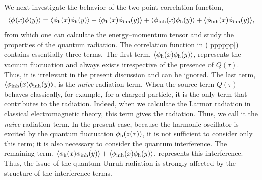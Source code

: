 \documentclass[aps,prd,preprintnumbers,nofootinbib,showpacs,11pt]{revtex4}%
\begin{document}
\begin{widetext}
We next investigate the behavior of  the two-point correlation function, 
\begin{eqnarray}
\langle\phi_{\rm }(x)\phi_{\rm }(y)\rangle=\langle\phi_{\rm h}(x)\phi_{\rm h}(y)\rangle+
\langle\phi_{\rm h}(x)\phi_{\rm inh}(y)\rangle
+\langle\phi_{\rm inh}(x)\phi_{\rm h}(y)\rangle
+\langle\phi_{\rm inh}(x)\phi_{\rm inh}(y)\rangle,
\label{pppppp}
\end{eqnarray}
from which one can calculate the energy--momentum tensor
and study the properties of the quantum radiation. 
The correlation function in (\ref{pppppp}) contains essentially three terms.
The first term, $\langle\phi_{\rm h}(x)\phi_{\rm h}(y)\rangle$, represents 
the vacuum fluctuation and always exists irrespective of the presence of $Q(\tau)$.
Thus, it is irrelevant in the present discussion and can be ignored.
The last term, $\langle\phi_{\rm inh}(x)\phi_{\rm inh}(y)\rangle$, is the {\it naive} radiation 
term. When the source term $Q(\tau)$ behaves classically, for example, for a charged particle,
it is the only term that contributes to the radiation. Indeed, when we calculate the Larmor radiation
in classical electromagnetic theory, this term gives the radiation. 
Thus, we call it the {\it naive} radiation term. In the present case, because the harmonic oscillator
is excited by the quantum fluctuation $\phi_{\rm h}(z(\tau))$, it is not sufficient to consider
only this term; it is also necessary to consider the quantum interference.
The remaining term, $\langle\phi_{\rm h}(x)\phi_{\rm inh}(y)\rangle
+\langle\phi_{\rm inh}(x)\phi_{\rm h}(y)\rangle$, represents this interference.
Thus, the issue of the quantum Unruh radiation is strongly affected by the structure of the
interference terms.


\end{widetext}
\end{document}
